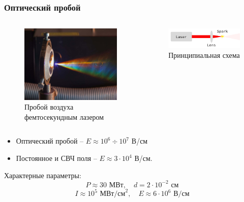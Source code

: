 \documentclass{beamer}
\begin{document}
	\begin{frame}
		\frametitle{Оптический пробой}
		\begin{columns}
			\begin{figure}
				\centering
				\includegraphics[width=1.05\linewidth]{res/new_femtosecond_laser_spark.jpg}
				\caption*{Пробой воздуха фемтосекундным лазером}
			\end{figure}
			
			\begin{figure}
				\centering
				\includegraphics[width=1.0\linewidth]{res/scheme.png}
				\caption*{Принципиальная схема}
			\end{figure}
			
			
		\end{columns}
		\begin{itemize}
			\item Оптический пробой -- $E \approx 10^6 \div 10^7$ В/см 
			\item Постоянное и СВЧ поля -- $E \approx 3 \cdot 10^4$ В/см. 
		\end{itemize}
		Характерные параметры:
		$$ P \approx 30 \text{ МВт}, \quad d = 2 \cdot 10^{-2} \text{ см} $$
		$$ I \approx 10^5 \text{ МВт/см}^2, \quad E \approx 6 \cdot 10^6 \text{ В/см} $$


	
	\end{frame}
\end{document}
